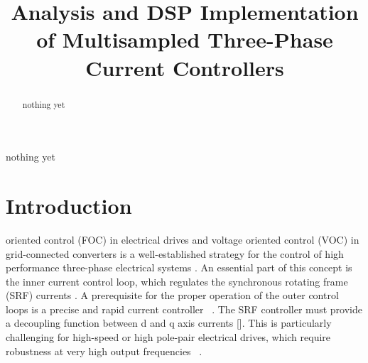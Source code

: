 \documentclass[journal]{IEEEtran}
\begin{document}
\title{Analysis and DSP Implementation of Multisampled Three-Phase Current Controllers}


\maketitle

\begin{abstract}
nothing yet
\end{abstract}

\begin{IEEEkeywords}
nothing yet
\end{IEEEkeywords}


\IEEEpeerreviewmaketitle

\section{Introduction}
 oriented control (FOC) in electrical drives and voltage oriented control (VOC) in grid-connected converters is a well-established strategy for the control of high performance three-phase electrical systems \cite{holmes2012}. An essential part of this concept is the inner current control loop, which regulates the synchronous rotating frame (SRF) currents \cite{holmes2009}. A prerequisite for the proper operation of the outer control loops is a precise and rapid current controller ~\cite{yepes2014,choi1998}. The SRF controller must provide a decoupling function between d and q axis currents []. This is particularly challenging for high-speed or high pole-pair electrical drives, which require robustness at very high output frequencies ~\cite{choi1998,hoffmann2016,yim2009}. 
\end{document}
